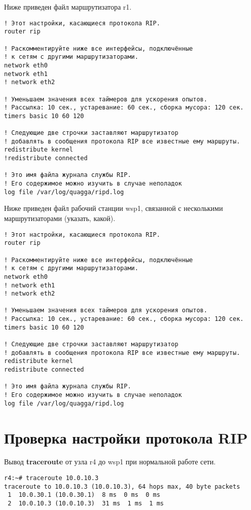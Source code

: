 \documentclass[a4paper,12pt]{article}
\begin{document}
Ниже приведен файл  маршрутизатора r1.

\begin{Verbatim}
! Этот настройки, касающиеся протокола RIP.
router rip

! Раскомментируйте ниже все интерфейсы, подключённые
! к сетям с другими маршрутизаторами.
network eth0
network eth1
! network eth2

! Уменьшаем значения всех таймеров для ускорения опытов.
! Рассылка: 10 сек., устаревание: 60 cек., сборка мусора: 120 сек.
timers basic 10 60 120

! Следующие две строчки заставляют маршрутизатор
! добавлять в сообщения протокола RIP все известные ему маршруты.
redistribute kernel
!redistribute connected

! Это имя файла журнала службы RIP.
! Его содержимое можно изучить в случае неполадок
log file /var/log/quagga/ripd.log
\end{Verbatim}



Ниже приведен файл  рабочий станции wsp1, связанной с несколькими маршрутизаторами (указать, какой).

\begin{Verbatim}
! Этот настройки, касающиеся протокола RIP.
router rip

! Раскомментируйте ниже все интерфейсы, подключённые
! к сетям с другими маршрутизаторами.
network eth0
! network eth1
! network eth2

! Уменьшаем значения всех таймеров для ускорения опытов.
! Рассылка: 10 сек., устаревание: 60 cек., сборка мусора: 120 сек.
timers basic 10 60 120

! Следующие две строчки заставляют маршрутизатор
! добавлять в сообщения протокола RIP все известные ему маршруты.
redistribute kernel
redistribute connected

! Это имя файла журнала службы RIP.
! Его содержимое можно изучить в случае неполадок
log file /var/log/quagga/ripd.log
\end{Verbatim}


\section{Проверка настройки протокола RIP}

Вывод \textbf{traceroute} от узла r4 до wsp1 при нормальной работе сети.

\begin{Verbatim}
r4:~# traceroute 10.0.10.3
traceroute to 10.0.10.3 (10.0.10.3), 64 hops max, 40 byte packets
 1  10.0.30.1 (10.0.30.1)  8 ms  0 ms  0 ms
 2  10.0.10.3 (10.0.10.3)  31 ms  1 ms  1 ms
\end{Verbatim}
\end{document}

